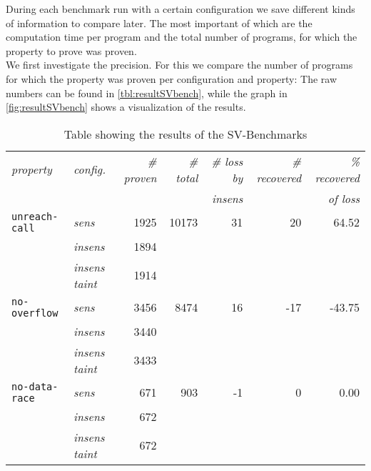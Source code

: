       During each benchmark run with a certain configuration we save different kinds of information to compare later. The most important of which are the computation time per program and the total number of programs, for which the property to prove was proven.\\
      We first investigate the precision. For this we compare the number of programs for which the property was proven per configuration and property: The raw numbers can be found in \autoref{tbl:resultSVbench}, while the graph in \autoref{fig:resultSVbench} shows a visualization of the results.\\

      \begin{table}
        \centering
        \begin{tabular}{l|l||r|r||r|r|r}
          \textit{property} & \textit{config.} & \textit{\# proven} & \textit{\# total} & \textit{\# loss by} & \textit{\# recovered} & \textit{\% recovered}\\
            &  &  &  & \textit{insens} & & \textit{of loss}\\
          \hline
          \texttt{unreach-call} & \textit{sens} & 1925 & 10173 & 31 & 20 & 64.52\\
          & \textit{insens} & 1894 & & & & \\
          & \textit{insens taint} & 1914 & & & & \\
          \hline
          \texttt{no-overflow} & \textit{sens} & 3456 & 8474 & 16 & -17 & -43.75\\
          & \textit{insens} & 3440 & & & & \\
          & \textit{insens taint} & 3433 & & & & \\
          \hline
          \texttt{no-data-race} & \textit{sens} & 671 & 903 & -1 & 0 & 0.00\\
          & \textit{insens} & 672 & & & & \\
          & \textit{insens taint} & 672 & & & & \\
          \hline
        \end{tabular}
        \caption{Table showing the results of the SV-Benchmarks}
        \label{tbl:resultSVbench}
      \end{table}

